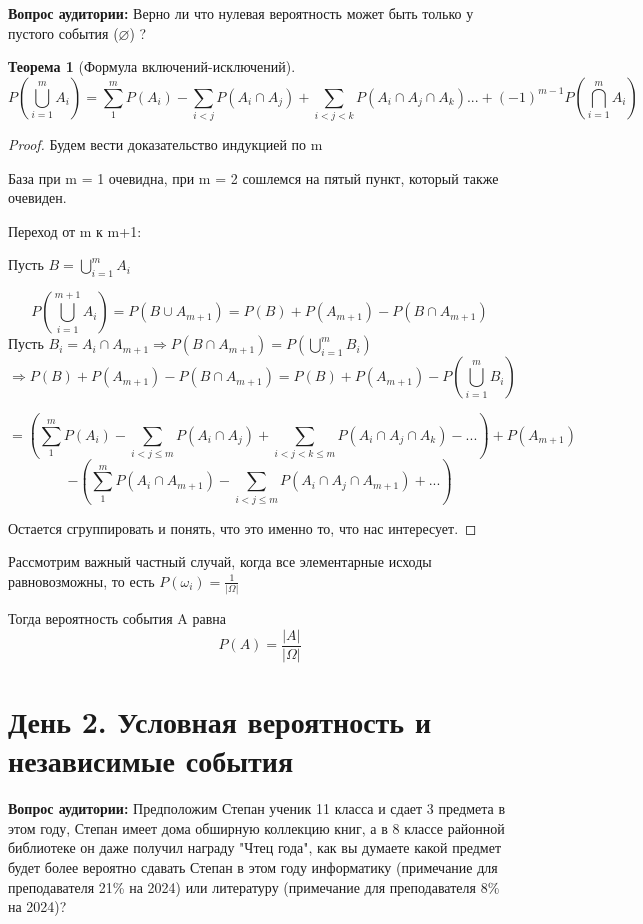 \documentclass{article}
\renewcommand{\le}{\leqslant}
\newtheorem{theorem}{Теорема}
\theoremstyle{definition}
\newcommand{\question}{\textbf{Вопрос аудитории: }}
\theoremstyle{remark}
\begin{document}
\question{Верно ли что нулевая вероятность может быть только у пустого события ($\varnothing$) ?}

\begin{theorem} [Формула включений-исключений]
    $$ 
    P(\bigcup\limits_{i=1}^{m} A_i) = \sum_{1}^{m} P(A_i) - \sum_{i<j} P(A_i \cap A_j) + \sum_{i<j<k} P(A_i \cap A_j \cap A_k) ... + (-1)^{m-1} P(\bigcap\limits_{i=1}^{m} A_i)
    $$
\end{theorem}
\begin{proof}
    Будем вести доказательство индукцией по m

    База при m = 1 очевидна, при m = 2 сошлемся на пятый пункт, который также очевиден.

    Переход от m к m+1:

    Пусть $B = \bigcup\limits_{i=1}^{m} A_i$

    $$
    P(\bigcup\limits_{i=1}^{m+1} A_i) = P(B \cup A_{m+1}) = P(B) + P(A_{m+1}) - P(B \cap A_{m+1})
    $$
    Пусть $B_i = A_i \cap A_{m+1} \Rightarrow P(B \cap A_{m+1}) = P(\bigcup\limits_{i=1}^{m} B_i)$
    $$
    \Rightarrow P(B) + P(A_{m+1}) - P(B \cap A_{m+1}) = P(B) + P(A_{m+1}) - P(\bigcup\limits_{i=1}^{m} B_i) 
    $$

    $$
    = (\sum_{1}^{m} P(A_i)  - \sum_{i<j \le m} P(A_i \cap A_j)  + \sum_{i<j<k \le m} P(A_i \cap A_j \cap A_k) - ... ) + P(A_{m+1}) 
    $$
    $$
    - (\sum_{1}^{m} P(A_i \cap A_{m+1})  - \sum_{i<j \le m} P(A_i \cap A_j  \cap A_{m+1})  + ... )
    $$

    Остается сгруппировать и понять, что это именно то, что нас интересует.
\end{proof}

Рассмотрим важный частный случай, когда все элементарные исходы равновозможны, 
то есть $P(\omega_i) = \frac{1}{|\varOmega|}$

Тогда вероятность события A равна
$$
P(A) = \frac{|A|}{|\varOmega|}
$$


\section{День 2. Условная вероятность и независимые события}


\question{Предположим Степан ученик 11 класса и сдает 3 предмета в этом году, Степан имеет дома обширную коллекцию книг,
 а в 8 классе районной библиотеке он даже получил награду "Чтец года", как вы думаете 
 какой предмет будет более вероятно сдавать Степан в этом году информатику (примечание для преподавателя 21\% на 2024) 
 или литературу (примечание для преподавателя 8\% на 2024)? }
\end{document}
